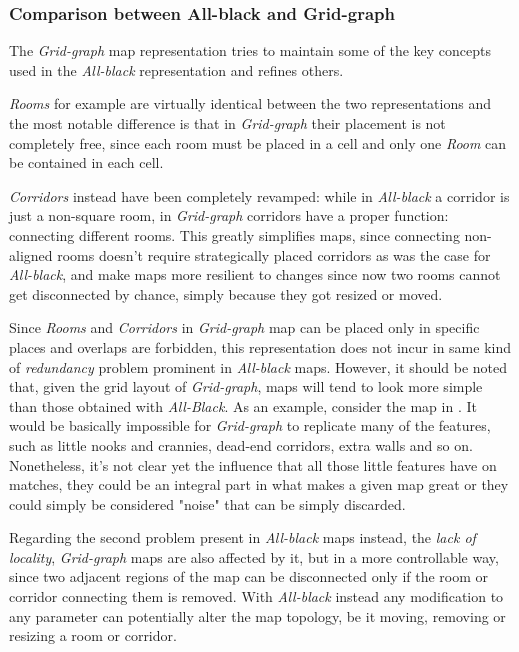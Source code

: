 \subsubsection{Comparison between All-black and Grid-graph}
The \textit{Grid-graph} map representation tries to maintain some of the key concepts used in the \textit{All-black} representation and refines others. 

\textit{Rooms} for example are virtually identical between the two representations and the most notable difference is that in \textit{Grid-graph} their placement is not completely free, since each room must be placed in a cell and only one \textit{Room} can be contained in each cell.

\textit{Corridors} instead have been completely revamped: while in \textit{All-black} a corridor is just a non-square room, in \textit{Grid-graph} corridors have a proper function: connecting different rooms. This greatly simplifies maps, since connecting non-aligned rooms doesn’t require strategically placed corridors as was the case for \textit{All-black}, and make maps more resilient to changes since now two rooms cannot get disconnected by chance, simply because they got resized or moved.

Since \textit{Rooms} and \textit{Corridors} in \textit{Grid-graph} map can be placed only in specific places and overlaps are forbidden, this representation does not incur in same kind of \textit{redundancy} problem prominent in \textit{All-black} maps. 
However, it should be noted that, given the grid layout of \textit{Grid-graph}, maps will tend to look more simple than those obtained with \textit{All-Black}. As an example, consider the map in . It would be basically impossible for \textit{Grid-graph} to replicate many of the features, such as little nooks and crannies, dead-end corridors, extra walls and so on.
Nonetheless, it's not clear yet the influence that all those little features have on matches, they could be an integral part in what makes a given map great or they could simply be considered "noise" that can be simply discarded.

Regarding the second problem present in \textit{All-black} maps instead, the \textit{lack of locality}, \textit{Grid-graph} maps are also affected by it, but in a more controllable way, since two adjacent regions of the map can be disconnected only if the room or corridor connecting them is removed. With \textit{All-black} instead any modification to any parameter can potentially alter the map topology, be it moving, removing or resizing a room or corridor.

